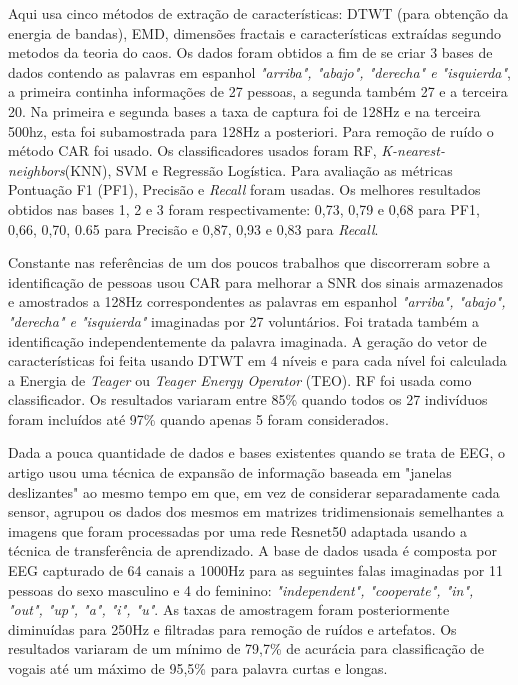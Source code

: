 			\par Aqui \cite{Hernandez-Del-ToroTonatiuh2021TaEB} usa cinco métodos de extração de características: DTWT (para obtenção da energia de bandas), EMD, dimensões fractais e características extraídas segundo metodos da teoria do caos. Os dados foram obtidos a fim de se criar 3 bases de dados contendo as palavras em espanhol \textit{"arriba", "abajo", "derecha" e "isquierda"}, a primeira continha informações de 27 pessoas, a segunda também 27 e a terceira 20. Na primeira e segunda bases a taxa de captura foi de 128Hz e na terceira 500hz, esta foi subamostrada para 128Hz a posteriori. Para remoção de ruído o método CAR foi usado. Os classificadores usados foram RF, \textit{K-nearest-neighbors}(KNN), SVM e Regressão Logística. Para avaliação as métricas Pontuação F1 (PF1), Precisão e \textit{Recall} foram usadas. Os melhores resultados obtidos nas bases 1, 2 e 3 foram respectivamente: 0,73, 0,79 e 0,68 para PF1, 0,66, 0,70, 0.65 para Precisão e 0,87, 0,93 e 0,83 para \textit{Recall}.
			
			\par Constante nas referências de \cite{Hernandez-Del-ToroTonatiuh2021TaEB} um dos poucos trabalhos que discorreram sobre a identificação de pessoas \cite{MOCTEZUMA2019201} usou CAR para melhorar a SNR dos sinais armazenados e amostrados a 128Hz correspondentes as palavras em espanhol \textit{"arriba", "abajo", "derecha" e "isquierda"} imaginadas por 27 voluntários. Foi tratada também a identificação independentemente da palavra imaginada. A geração do vetor de características foi feita usando DTWT em 4 níveis e para cada nível foi calculada a Energia de \textit{Teager} ou \textit{Teager Energy Operator} (TEO). RF foi usada como classificador. Os resultados variaram entre 85\% quando todos os 27 indivíduos foram incluídos até 97\% quando apenas 5 foram considerados.
			
			\par Dada a pouca quantidade de dados e bases existentes quando se trata de EEG, o artigo \cite{PanachakelJerrinRamakrishnan} usou uma técnica de expansão de informação baseada em "janelas deslizantes" ao mesmo tempo em que, em vez de considerar separadamente cada sensor, agrupou os dados dos mesmos em matrizes tridimensionais semelhantes a imagens que foram processadas por uma rede Resnet50 \cite{DBLP:journals/corr/HeZRS15} adaptada usando a técnica de transferência de aprendizado. A base de dados usada \cite{nguyen2018inferring} é composta por EEG capturado de 64 canais a 1000Hz para as seguintes falas imaginadas por 11 pessoas do sexo masculino e 4 do feminino: \textit{"independent", "cooperate", "in", "out", "up", "a", "i", "u"}. As taxas de amostragem foram posteriormente diminuídas para 250Hz e filtradas para remoção de ruídos e artefatos. Os resultados variaram de um mínimo de 79,7\% de acurácia para classificação de vogais até um máximo de 95,5\% para palavra curtas e longas.
			
